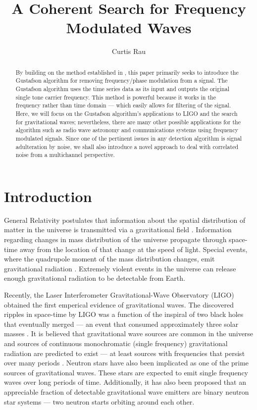 \documentclass[onecolumn, groupedaddress, 10pt]{revtex4-1}
\begin{document}
\title{A Coherent Search for Frequency Modulated Waves}
\author{Curtis Rau}
\begin{abstract}
By building on the method established in \citep{Deanna}, this paper primarily seeks to introduce the Gustafson algorithm for removing frequency/phase modulation from a signal. The Gustafson algorithm uses the time series data as its input and outputs the original single tone carrier frequency. This method is powerful because it works in the frequency rather than time domain --- which easily allows for filtering of the signal. Here, we will focus on the Gustafson algorithm's applications to LIGO and the search for gravitational waves; nevertheless, there are many other possible applications for the algorithm such as radio wave astronomy and communications systems using frequency modulated signals. Since one of the pertinent issues in any detection algorithm is signal adulteration by noise, we shall also introduce a novel approach to deal with correlated noise from a multichannel perspective.
\end{abstract}
\maketitle

\section{Introduction}
General Relativity postulates that information about the spatial distribution of matter in the universe is transmitted via a gravitational field \cite{einstein1990gravitational}. Information regarding changes in mass distribution of the universe propagate through space-time away from the location of that change at the speed of light.  Special events, where the quadrupole moment of the mass distribution changes, emit gravitational radiation \cite{poisson1998gravitational}.  Extremely violent events in the universe can release enough gravitational radiation to be detectable from Earth.

Recently, the Laser Interferometer Gravitational-Wave Observatory (LIGO) obtained the first emperical evidence of gravitational waves. The discovered ripples in space-time by LIGO was a function of the inspiral of two black holes that eventually merged --- an event that consumed approximately three solar masses \citep{abbott}.  It is believed that gravitational wave sources are common in the universe and sources of continuous monochromatic (single frequency) gravitational radiation are predicted to exist --- at least sources with frequencies that persist over many periods \cite{magalhaes1995determination}. Neutron stars have also been implicated as one of the prime sources of gravitational waves.  These stars are expected to emit single frequency waves over long periods of time.  Additionally, it has also been proposed that an appreciable fraction of detectable gravitational wave emitters are binary neutron star systems --- two neutron starts orbiting around each other.
\end{document}
